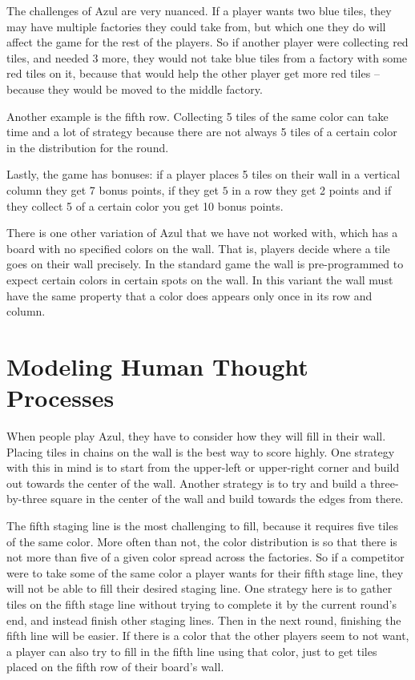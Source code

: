 \documentclass[12pt]{article}
\begin{document}
The challenges of Azul are very nuanced. If a player wants two blue tiles, they may have multiple factories they could take from,
but which one they do will affect the game for the rest of the players. So if another player were collecting red tiles, and needed 3 more,
they would not take blue tiles from a factory with some red tiles on it, because that
would help the other player get more red tiles -- because they would be moved to the middle factory. 

Another example is the fifth row.
Collecting 5 tiles of the same color can take time and a lot of strategy because there are not always 5 tiles of a
certain color in the distribution for the round.

Lastly, the game has bonuses: if a player places 5 tiles on their wall in a vertical column they get 7 bonus points, if they get $5$ in a row they get 2 points and if they collect 5 of a certain color you get 10 bonus points. 

There is one other variation of Azul that we have not worked with, which has a board
with no specified colors on the wall. That is, players decide where a tile goes on their wall precisely.
In the standard game the wall is pre-programmed to expect certain colors
in certain spots on the wall. In this variant the wall must have the same property that a color does appears only once in its row and column.

\section{Modeling Human Thought Processes}

%
%

When people play Azul, they have to consider how they will fill in their wall.
Placing tiles in chains on the wall is the best way to score highly.
One strategy with this in mind is to start from the upper-left or upper-right corner and build out towards the center of the wall.
Another strategy is to try and build a three-by-three square in the center of the
wall and build towards the edges from there.

The fifth staging line is the most challenging to fill, because it requires
five tiles of the same color. More often than not, the color distribution is so that
there is not more than five of a given color spread across the factories.
So if a competitor were to take some of the same color a player wants for their fifth stage line, they will not be able to fill their desired staging line.
One strategy here is to gather tiles on the fifth stage line without trying to complete it by the current round's end, and instead finish other
staging lines. Then in the next round, finishing the fifth line will be easier.
If there is a color that the other players seem to not want, a player can also try to
fill in the fifth line using that color, just to get tiles placed on the fifth row 
of their board's wall.
\end{document}
